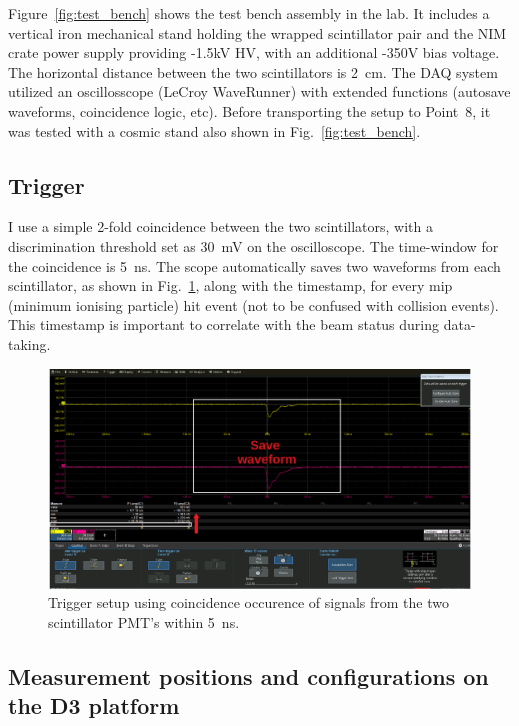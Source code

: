 Figure~\ref{fig:test_bench} shows the test bench assembly in the lab. It includes a vertical iron mechanical stand holding the wrapped scintillator pair and the NIM crate power supply providing -1.5kV HV, with an additional -350V bias voltage. The horizontal distance between the two scintillators is 2~cm. The DAQ system utilized an oscillosscope (LeCroy WaveRunner) with extended functions (autosave waveforms, coincidence logic, etc). Before transporting the setup to Point~8, it was tested with a cosmic stand also shown in Fig.~\ref{fig:test_bench}. 


\subsection{Trigger}
I use a simple 2-fold coincidence between the two scintillators, with a discrimination threshold set as 30~mV on the oscilloscope. The time-window for the coincidence is 5~ns. The scope automatically saves two waveforms from each scintillator, as shown in Fig.~\ref{fig:waveform}, along with the timestamp, for every mip (minimum ionising particle) hit event (not to be confused with collision events). This timestamp is important to correlate with the beam status during data-taking.

\begin{figure}
\centering
    \includegraphics[width=16cm]{figs/INT/waveform.pdf}
\caption{\label{fig:waveform}
    Trigger setup using coincidence occurence of signals from the two scintillator PMT's within 5~ns. 
}
\end{figure}

\subsection{Measurement positions and configurations on the D3 platform}

